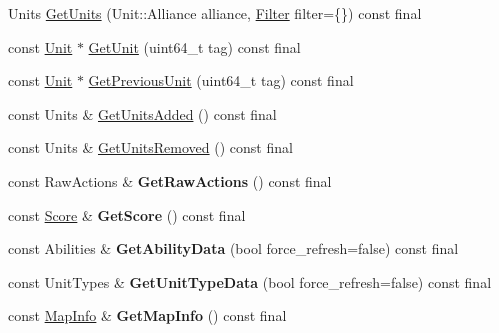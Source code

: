 \begin{DoxyCompactItemize}
Units \hyperlink{classsc2_1_1_observation_imp_a9ec74a3937ae047dbeb78575c79091d4}{Get\+Units} (Unit\+::\+Alliance alliance, \hyperlink{sc2__interfaces_8h_af4abbeea3291e718cf2283e1390f3670}{Filter} filter=\{\}) const final
\item 
const \hyperlink{classsc2_1_1_unit}{Unit} $\ast$ \hyperlink{classsc2_1_1_observation_imp_abb210dcc3b4ac518543902d97aee4b10}{Get\+Unit} (uint64\+\_\+t tag) const final
\item 
const \hyperlink{classsc2_1_1_unit}{Unit} $\ast$ \hyperlink{classsc2_1_1_observation_imp_ae0f23420019a31bf108d4ce9eec62cc9}{Get\+Previous\+Unit} (uint64\+\_\+t tag) const final
\item 
const Units \& \hyperlink{classsc2_1_1_observation_imp_a0f4061d42b035d297b8a8bd0f73e5241}{Get\+Units\+Added} () const final
\item 
const Units \& \hyperlink{classsc2_1_1_observation_imp_a6c2fd3bf3abf69dcb868c7cd0a7ffeae}{Get\+Units\+Removed} () const final
\item 
\mbox{\label{classsc2_1_1_observation_imp_accd36bca2251ff23157a37a5197afc32}} 
const Raw\+Actions \& {\bfseries Get\+Raw\+Actions} () const final
\item 
\mbox{\label{classsc2_1_1_observation_imp_ad05dbbcda24c6c43be0e9c97c3c9211b}} 
const \hyperlink{structsc2_1_1_score}{Score} \& {\bfseries Get\+Score} () const final
\item 
\mbox{\label{classsc2_1_1_observation_imp_a142311ec3e6ab5128aca87ea3e82c139}} 
const Abilities \& {\bfseries Get\+Ability\+Data} (bool force\+\_\+refresh=false) const final
\item 
\mbox{\label{classsc2_1_1_observation_imp_a8d68d02d19f7810e60ccfebdd555fa6d}} 
const Unit\+Types \& {\bfseries Get\+Unit\+Type\+Data} (bool force\+\_\+refresh=false) const final
\item 
\mbox{\label{classsc2_1_1_observation_imp_aca92e7d4a955461692720481903e596b}} 
const \hyperlink{structsc2_1_1_map_info}{Map\+Info} \& {\bfseries Get\+Map\+Info} () const final
\item 
\mbox{\label{classsc2_1_1_observation_imp_a2b21ca608004c8373a3fbf41cbd6aff8}} 

\end{DoxyCompactItemize}
